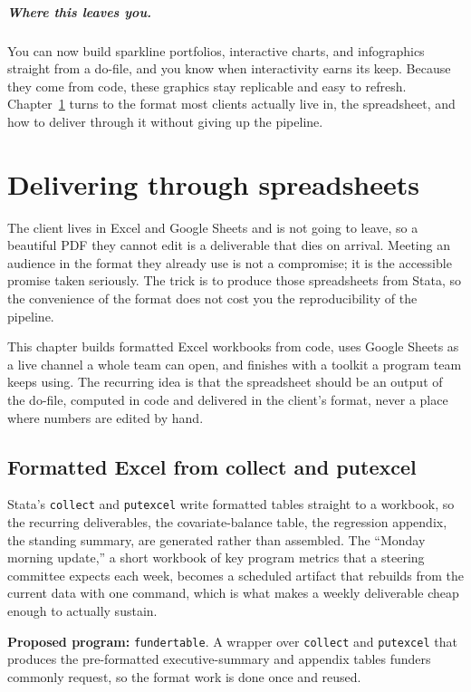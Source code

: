\documentclass[
    a4paper,
    fontsize=10pt,
    twoside=true,
    numbers=noenddot,
]{kaobook}
\begin{document}
\paragraph{Where this leaves you.} You can now build sparkline portfolios, interactive charts, and infographics straight from a do-file, and you know when interactivity earns its keep. Because they come from code, these graphics stay replicable and easy to refresh. Chapter~\ref{ch:sheets} turns to the format most clients actually live in, the spreadsheet, and how to deliver through it without giving up the pipeline.

\chapter{Delivering through spreadsheets}\label{ch:sheets}

The client lives in Excel and Google Sheets and is not going to leave, so a beautiful PDF they cannot edit is a deliverable that dies on arrival. Meeting an audience in the format they already use is not a compromise; it is the accessible promise taken seriously. The trick is to produce those spreadsheets from Stata, so the convenience of the format does not cost you the reproducibility of the pipeline.

This chapter builds formatted Excel workbooks from code, uses Google Sheets as a live channel a whole team can open, and finishes with a toolkit a program team keeps using. The recurring idea is that the spreadsheet should be an output of the do-file, computed in code and delivered in the client's format, never a place where numbers are edited by hand.

\section{Formatted Excel from collect and putexcel}
Stata's \texttt{collect} and \texttt{putexcel} write formatted tables straight to a workbook, so the recurring deliverables, the covariate-balance table, the regression appendix, the standing summary, are generated rather than assembled. The \enquote{Monday morning update,} a short workbook of key program metrics that a steering committee expects each week, becomes a scheduled artifact that rebuilds from the current data with one command, which is what makes a weekly deliverable cheap enough to actually sustain.

\begin{kaobox}[frametitle=Ado-file Idea: \texttt{fundertable}]
\textbf{Proposed program:} \texttt{fundertable}. A wrapper over \texttt{collect} and \texttt{putexcel} that produces the pre-formatted executive-summary and appendix tables funders commonly request, so the format work is done once and reused.
\end{kaobox}
\end{document}
